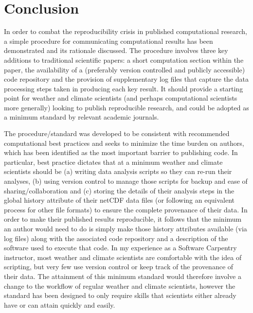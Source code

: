 \section{Conclusion}

In order to combat the reproducibility crisis in published computational research, a simple procedure for communicating computational results has been demonstrated \citep{Irving2015} and its rationale discussed. The procedure involves three key additions to traditional scientific papers: a short computation section within the paper, the availability of a (preferably version controlled and publicly accessible) code repository and the provision of supplementary log files that capture the data processing steps taken in producing each key result. It should provide a starting point for weather and climate scientists (and perhaps computational scientists more generally) looking to publish reproducible research, and could be adopted as a minimum standard by relevant academic journals.

The procedure/standard was developed to be consistent with recommended computational best practices and seeks to minimize the time burden on authors, which has been identified as the most important barrier to publishing code. In particular, best practice dictates that at a minimum weather and climate scientists should be (a) writing data analysis scripts so they can re-run their analyses, (b) using version control to manage those scripts for backup and ease of sharing/collaboration and (c) storing the details of their analysis steps in the global history attribute of their netCDF data files (or following an equivalent process for other file formats) to ensure the complete provenance of their data. In order to make their published results reproducible, it follows that the minimum an author would need to do is simply make those history attributes available (via log files) along with the associated code repository and a description of the software used to execute that code. In my experience as a Software Carpentry instructor, most weather and climate scientists are comfortable with the idea of scripting, but very few use version control or keep track of the provenance of their data. The attainment of this minimum standard would therefore involve a change to the workflow of regular weather and climate scientists, however the standard has been designed to only require skills that scientists either already have or can attain quickly and easily.  

